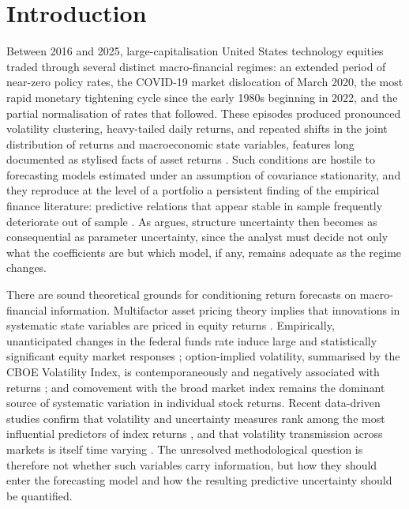 
\section{Introduction}
\label{sec:intro}

Between 2016 and 2025, large-capitalisation United States technology equities
traded through several distinct macro-financial regimes: an extended period of
near-zero policy rates, the COVID-19 market dislocation of March 2020, the most
rapid monetary tightening cycle since the early 1980s beginning in 2022, and the
partial normalisation of rates that followed. These episodes produced pronounced
volatility clustering, heavy-tailed daily returns, and repeated shifts in the
joint distribution of returns and macroeconomic state variables, features long
documented as stylised facts of asset returns \citep{cont2001empirical}. Such
conditions are hostile to forecasting models estimated under an assumption of
covariance stationarity, and they reproduce at the level of a portfolio a
persistent finding of the empirical finance literature: predictive relations
that appear stable in sample frequently deteriorate out of sample
\citep{welch2008comprehensive, timmermann2008elusive}. As \citet{west2020bayesian}
argues, structure uncertainty then becomes as consequential as parameter
uncertainty, since the analyst must decide not only what the coefficients are
but which model, if any, remains adequate as the regime changes.

There are sound theoretical grounds for conditioning return forecasts on
macro-financial information. Multifactor asset pricing theory implies that
innovations in systematic state variables are priced in equity returns
\citep{chen1986economic}. Empirically, unanticipated changes in the federal funds
rate induce large and statistically significant equity market responses
\citep{bernanke2005explains}; option-implied volatility, summarised by the CBOE
Volatility Index, is contemporaneously and negatively associated with returns
\citep{whaley2000investor}; and comovement with the broad market index remains
the dominant source of systematic variation in individual stock returns. Recent
data-driven studies confirm that volatility and uncertainty measures rank among
the most influential predictors of index returns \citep{latif2025integrating},
and that volatility transmission across markets is itself time varying
\citep{agrawal2026volatility}. The unresolved methodological question is
therefore not whether such variables carry information, but how they should enter
the forecasting model and how the resulting predictive uncertainty should be
quantified.

